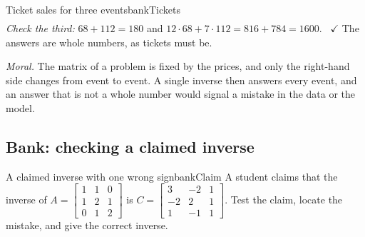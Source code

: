 \documentclass[11pt]{article}
\begin{document}
\begin{exmp}{Ticket sales for three events}{bankTickets}
\begin{align*}
\end{align*}
\emph{Check the third:} $68+112=180$ and $12\cdot68+7\cdot112=816+784=1600$. \ $\checkmark$ The answers are whole numbers, as tickets must be.

\emph{Moral.} The matrix of a problem is fixed by the prices, and only the right-hand side changes from event to event. A single inverse then answers every event, and an answer that is not a whole number would signal a mistake in the data or the model.
\end{exmp}

\subsection*{Bank: checking a claimed inverse}

\begin{exmp}{A claimed inverse with one wrong sign}{bankClaim}
A student claims that the inverse of $A=\begin{bmatrix}1&1&0\\1&2&1\\0&1&2\end{bmatrix}$ is $C=\begin{bmatrix}3&-2&1\\-2&2&1\\1&-1&1\end{bmatrix}$. Test the claim, locate the mistake, and give the correct inverse.


\end{exmp}
\end{document}
